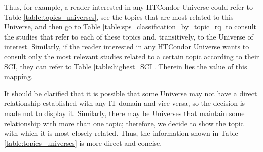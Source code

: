 Thus, for example, a reader interested in any HTCondor Universe could refer to Table \ref{table:topics_universes}, see the topics that are most related to this Universe, and then go to Table \ref{table:sps_classification_by_topic_rq} to consult the studies that refer to each of these topics and, transitively, to the Universe of interest. Similarly, if the reader interested in any HTCondor Universe wants to consult only the most relevant studies related to a certain topic according to their SCI, they can refer to Table \ref{table:highest_SCI}. Therein lies the value of this mapping.

It should be clarified that it is possible that some Universe may not have a direct relationship established with any IT domain and vice versa, so the decision is made not to display it. Similarly, there may be Universes that maintain some relationship with more than one topic; therefore, we decide to show the topic with which it is most closely related. Thus, the information shown in Table \ref{table:topics_universes} is more direct and concise.


